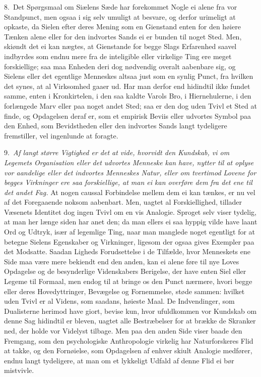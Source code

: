 \documentclass[12pt,a4paper]{article}
\newcommand{\opage}[1]{\marginnote{\footnotesize\textit{[#1]}}}
\begin{document}
8.~Det Spørgsmaal om Siælens Sæde har forekommet Nogle ei alene fra vor
Standpunct, men ogsaa i sig selv umuligt at besvare, og derfor urimeligt at
opkaste, da Sielen efter deres Mening som en Gienstand enten for den høiere
Tænken alene eller for den indvortes Sands ei er bunden til noget Sted. Men,
skiøndt
\opage{17} det ei kan nægtes, at Gienstande for begge Slags Erfarenhed saavel indbyrdes som
endnu mere fra de inteligible eller virkelige Ting ere meget forskiellige; saa
maa Enheden deri dog nødvendig overalt aabenbare sig, og Sielens eller det
egentlige Menneskes altsaa just som en synlig Punct, fra hvilken det synes, at al
Virksomhed gaaer ud. Har man derfor end hidindtil ikke fundet samme, enten i
Kronkirtelen, i den saa kaldte Varols Bro, i Hiernehulerne, i den forlængede Marv
eller paa noget andet Sted; saa er den dog uden Tvivl et Sted at finde, og
Opdagelsen deraf er, som et empirisk Beviis eller udvortes Symbol paa den Enhed,
som Bevidstheden eller den indvortes Sands langt tydeligere fremstiller, vel
ingenlunde at foragte.

9.~\emph{Af langt større Vigtighed er det at vide, hvorvidt den Kundskab, vi om
Legemets Organisation eller det udvortes Menneske kan have, nytter til at oplyse
vor aandelige eller det indvortes Menneskes Natur, eller om tvertimod Lovene for
begges Virkninger ere saa forskiellige, at man ei kan overføre dem fra det ene
til det andet Fag.} At nogen caussal Forbindelse mellem dem ei kan tænkes, er nu
vel af det Foregaaende noksom aabenbart. Men, uagtet al Forskiellighed, tillader
Væsenets Identitet dog ingen Tvivl om en vis Analogie. Sproget selv viser
tydelig, at man her længe siden
\opage{18} har anet den; da man ellers ei saa hyppig vilde have laant Ord og Udtryk, især
af legemlige Ting, naar man manglede noget egentligt for at betegne Sielens
Egenskaber og Virkninger, ligesom der ogsaa gives Exempler paa det Modsatte.
Saadan Ligheds Forudsettelse i de Tilfælde, hvor Menneskets ene Side maa være
mere bekiendt end den anden, kan ei alene føre til nye Loves Opdagelse og de
besynderlige Videnskabers Berigelse, der have enten Siel eller Legeme til
Formaal, men endog til at bringe os den Punct nærmere, hvori begge eller deres
Hovedyttringer, Bevægelse og Fornemmelse, støde sammen: hvilket uden Tvivl er al
Videns, som saadans, høieste Maal. De Indvendinger, som Dualisterne herimod have
giort, bevise kun, hvor ufuldkommen vor Kundskab om denne Sag hidindtil er
bleven, uagtet alle Bestræbelser for at brække de Skranker ned, der holde vor
Videlyst tilbage. Men paa den anden Side viser baade den Fremgang, som den
psychologiske Anthropologie virkelig har Naturforskeres Flid at takke, og den
Fornøielse, som Opdagelsen af enhver skiult Analogie medfører, endnu langt
tydeligere, at man om et lykkeligt Udfald af denne Flid ei bør mistvivle.
\end{document}
